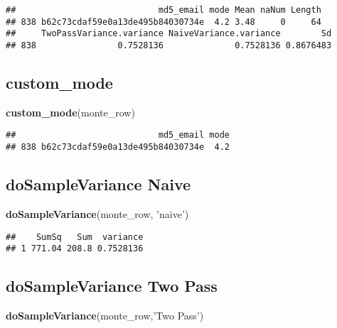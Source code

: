 \documentclass[
]{article}
\newenvironment{Shaded}{\begin{snugshade}}{\end{snugshade}}
\newcommand{\KeywordTok}[1]{\textcolor[rgb]{0.13,0.29,0.53}{\textbf{#1}}}
\newcommand{\NormalTok}[1]{#1}
\newcommand{\StringTok}[1]{\textcolor[rgb]{0.31,0.60,0.02}{#1}}
\begin{document}
\begin{verbatim}
##                            md5_email mode Mean naNum Length
## 838 b62c73cdaf59e0a13de495b84030734e  4.2 3.48     0     64
##     TwoPassVariance.variance NaiveVariance.variance        Sd
## 838                0.7528136              0.7528136 0.8676483
\end{verbatim}

\hypertarget{custom_mode}{%
\subsection{custom\_mode}\label{custom_mode}}

\begin{Shaded}
\begin{Highlighting}[]
\KeywordTok{custom_mode}\NormalTok{(monte_row)}
\end{Highlighting}
\end{Shaded}

\begin{verbatim}
##                            md5_email mode
## 838 b62c73cdaf59e0a13de495b84030734e  4.2
\end{verbatim}

\hypertarget{dosamplevariance-naive}{%
\subsection{doSampleVariance Naive}\label{dosamplevariance-naive}}

\begin{Shaded}
\begin{Highlighting}[]
\KeywordTok{doSampleVariance}\NormalTok{(monte_row, }\StringTok{'naive'}\NormalTok{)}
\end{Highlighting}
\end{Shaded}

\begin{verbatim}
##    SumSq   Sum  variance
## 1 771.04 208.8 0.7528136
\end{verbatim}

\hypertarget{dosamplevariance-two-pass}{%
\subsection{doSampleVariance Two Pass}\label{dosamplevariance-two-pass}}

\begin{Shaded}
\begin{Highlighting}[]
\KeywordTok{doSampleVariance}\NormalTok{(monte_row,}\StringTok{'Two Pass'}\NormalTok{)}
\end{Highlighting}
\end{Shaded}
\end{document}
